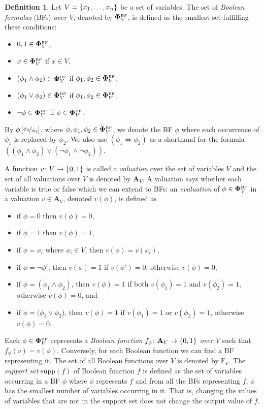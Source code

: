 \documentclass[
  digital, %
  color,
  twoside, %
  table,   %
  nolof,     %
  nolot,     %
]{fithesis3}
\let\setbuilder\set
\newcommand{\simpleset}[1]{\{{#1}\}}
\renewcommand{\set}[1]{\normalexpandarg\IfSubStr{#1}{|}{\setbuilder{#1}}{\simpleset{#1}}}
\theoremstyle{definition}
\newtheorem{definition}{Definition}
\theoremstyle{remark}
\newcommand{\substitute}[2]{\left[ \nicefrac{#2}{#1} \right]}
\newcommand{\BF}[1]{\mathbf{\Phi}_{#1}^{\normalfont{\text{\tiny BF}}}}
\newcommand{\valtns}[1]{\mathbf{A}_{#1}}
\newcommand{\BFuncs}[1]{\mathbb{F}_{#1}}
\newcommand{\supp}[1]{\mathrm{supp}(#1)}
\newcommand{\lequal}{\Leftrightarrow}
\begin{document}
\begin{definition}
Let $V = \set{x_1, \dots, x_n}$ be a set of variables. The set of \emph{Boolean formulas} (BFs) \emph{over $V$}, denoted by $\BF{V}$, is defined as the smallest set fulfilling these conditions:
\begin{itemize}
    \item $0,1 \in \BF{V}$,
    \item $x \in \BF{V}$ if $x \in V$,
    \item $(\phi_1 \land \phi_2) \in \BF{V}$ if $\phi_1, \phi_2 \in \BF{V}$,
    \item $(\phi_1 \lor \phi_2) \in \BF{V}$ if $\phi_1, \phi_2 \in \BF{V}$,
    \item $\neg\phi \in \BF{V}$ if $\phi \in \BF{V}$.
\end{itemize}
\end{definition}
By $\phi\substitute{\phi_1}{\phi_2}$, where $\phi,\phi_1,\phi_2 \in \BF{V}$, we denote the BF $\phi$ where each occurrence of $\phi_1$ is replaced by $\phi_2$. We also use $(\phi_1 \lequal \phi_2)$ as a shorthand for the formula $((\phi_1 \land \phi_2) \lor (\neg \phi_1 \land \neg \phi_2))$.

A function $v\colon V \to \set{0,1}$ is called a \emph{valuation} over the set of variables $V$ and the set of all valuations over $V$ is denoted by $\valtns{V}$. A valuation says whether each variable is true or false which we can extend to BFs: an \emph{evaluation} of $\phi \in \BF{V}$ in a valuation $v \in \valtns{V}$, denoted $v(\phi)$, is defined as %
\begin{itemize}
    \item if $\phi = 0$ then $v(\phi) = 0$,
    \item if $\phi = 1$ then $v(\phi) = 1$,
    \item if $\phi = x_i$ where $x_i \in V$, then $v(\phi) = v(x_i)$,
    \item if $\phi = \neg\phi'$, then $v(\phi) = 1$ if $v(\phi') = 0$, otherwise $v(\phi) = 0$,
    \item if $\phi = (\phi_1 \land \phi_2)$, then $v(\phi) = 1$ if both $v(\phi_1) = 1$ and $v(\phi_2) = 1$, otherwise $v(\phi) = 0$, and
    \item if $\phi = (\phi_1 \lor \phi_2$), then $v(\phi) = 1$ if $v(\phi_1) = 1$ or $v(\phi_2) = 1$, otherwise $v(\phi) = 0$.
\end{itemize}
Each $\phi \in \BF{V}$ represents a \emph{Boolean function} $f_{\phi}\colon \valtns{V} \to \set{0,1}$ \emph{over $V$} such that $f_{\phi}(v) = v(\phi)$. Conversely, for each Boolean function we can find a BF representing it. The set of all Boolean functions over $V$ is denoted by $\BFuncs{V}$. The \emph{support set} $\supp{f}$ of Boolean function $f$ is defined as the set of variables occurring in a BF $\phi$ where $\phi$ represents $f$ and from all the BFs representing $f$, $\phi$ has the smallest number of variables occurring in it. That is, changing the values of variables that are not in the support set does not change the output value of $f$.
\end{document}
